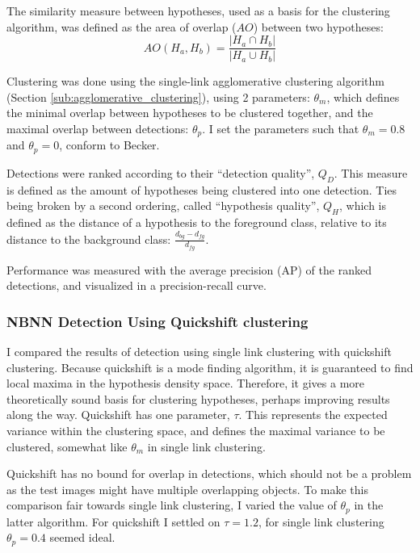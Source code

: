 The similarity measure between hypotheses, used as a basis for the clustering algorithm, was defined as the area of overlap ($AO$) between two hypotheses:
\begin{equation}
    AO(H_a, H_b)= \frac{|H_a\cap H_b|}{|H_a\cup H_b|}
\end{equation}

Clustering was done using the single-link agglomerative clustering algorithm (Section \ref{sub:agglomerative_clustering}), using 2 parameters: $\theta_m$, which defines the minimal overlap between hypotheses to be clustered together, and the maximal overlap between detections: $\theta_p$. I set the parameters such that $\theta_m = 0.8$ and $\theta_p = 0$, conform to Becker.

Detections were ranked according to their ``detection quality'', $Q_D$. This measure is defined as the amount of hypotheses being clustered into one detection. Ties being broken by a second ordering, called ``hypothesis quality'', $Q_H$, which is defined as the distance of a hypothesis to the foreground class, relative to its distance to the background class: $\frac{d_{bg} - d_{fg}}{d_{fg}}$. 

Performance was measured with the average precision (AP) of the ranked detections, and visualized in a precision-recall curve.

\subsubsection{NBNN Detection Using Quickshift clustering} %
\label{sub:nbnn_detection_using_quickshift_clustering}


I compared the results of detection using single link clustering with quickshift clustering. Because quickshift is a mode finding algorithm, it is guaranteed to find local maxima in the hypothesis density space. Therefore, it gives a more theoretically sound basis for clustering hypotheses, perhaps improving results along the way. Quickshift has one parameter, $\tau$. This represents the expected variance within the clustering space, and defines the maximal variance to be clustered, somewhat like $\theta_m$ in single link clustering.

Quickshift has no bound for overlap in detections, which should not be a problem as the test images might have multiple overlapping objects. To make this comparison fair towards single link clustering, I varied the value of $\theta_p$ in the latter algorithm. For quickshift I settled on $\tau = 1.2$, for single link clustering $\theta_p = 0.4$ seemed ideal.

